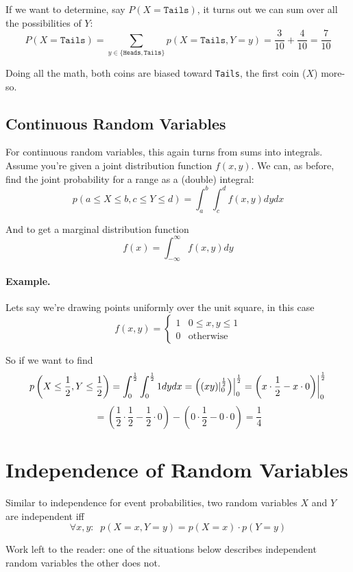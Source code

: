 If we want to determine, say $P(X=\texttt{Tails})$, it turns out we can sum over all the possibilities of $Y$: 
\[P(X=\texttt{Tails}) = \sum_{y\in\{\texttt{Heads},\texttt{Tails}\}}p(X=\texttt{Tails},Y=y) = \frac{3}{10} + \frac{4}{10} = \frac{7}{10}\]

Doing all the math, both coins are biased toward \texttt{Tails},  the first coin ($X$) more-so. 

\subsection{Continuous Random Variables}
For continuous random variables, this again turns from sums into integrals. 
Assume you're given a joint distribution function $f(x,y)$.
We can, as before, find the joint probability for a range as a (double) integral: 
\[p(a \le X \le b, c \le Y \le d) = \int_a^b \int_c^d f(x,y) dy dx\]

And to get a marginal distribution function 
\[f(x) = \int_{-\infty}^\infty f(x,y) dy\]


\paragraph{Example.} 
Lets say we're drawing points uniformly over the unit square, 
in this case 
\[f(x,y) = \begin{cases} 1 & 0 \le x,y \le 1\\ 0 & \text{otherwise}\end{cases}\]

So if we want to find 
\[ p\left(X\le \frac{1}{2}, Y \le \frac{1}{2}\right) = \int_0^\frac{1}{2} \int_0^\frac{1}{2} 1 dydx = 
\left(\left(xy\middle)\right\rvert_{0}^{\frac{1}{2}}\middle)\right\rvert_{0}^{\frac{1}{2}} = 
\left(x\cdot\frac{1}{2}-x\cdot0\middle)\right\rvert_{0}^{\frac{1}{2}}\]\[ = 
\left(\frac{1}{2}\cdot\frac{1}{2} - \frac{1}{2}\cdot0\right) - \left(0 \cdot\frac{1}{2} - 0 \cdot 0\right) = \frac{1}{4}\]

\section{Independence of Random Variables}
Similar to independence for event probabilities, two random variables $X$ and $Y$ are independent iff 
\[
\forall x, y : \;\; p(X=x,Y=y) = p(X=x)\cdot p(Y=y)
\]


Work left to the reader: one of the situations below  describes independent random variables the other does not. 

